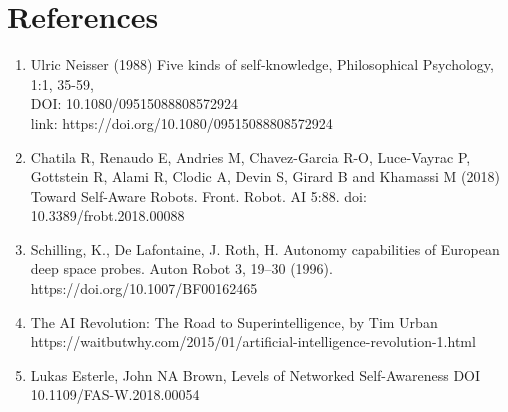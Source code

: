 \documentclass{amsbook}
\begin{document}
\clearpage
\huge{\section{References}}
\begin{enumerate}
    \item  Ulric Neisser (1988) Five kinds of self‐knowledge, Philosophical Psychology, 1:1, 35-59, \\DOI: 10.1080/09515088808572924 \\ link: https://doi.org/10.1080/09515088808572924
    \item  Chatila R, Renaudo E, Andries M, Chavez-Garcia R-O, Luce-Vayrac P, Gottstein R, Alami R, Clodic A, Devin S, Girard B and Khamassi M (2018) Toward Self-Aware Robots. Front. Robot. AI 5:88. doi: 10.3389/frobt.2018.00088
    \item Schilling, K., De Lafontaine, J. Roth, H. Autonomy capabilities of European deep space probes. Auton Robot 3, 19–30 (1996). https://doi.org/10.1007/BF00162465
    \item The AI Revolution: The Road to Superintelligence, by Tim Urban
    https://waitbutwhy.com/2015/01/artificial-intelligence-revolution-1.html
    \item Lukas Esterle, John NA Brown, Levels of Networked Self-Awareness DOI 10.1109/FAS-W.2018.00054
\end{enumerate}
\end{document}

